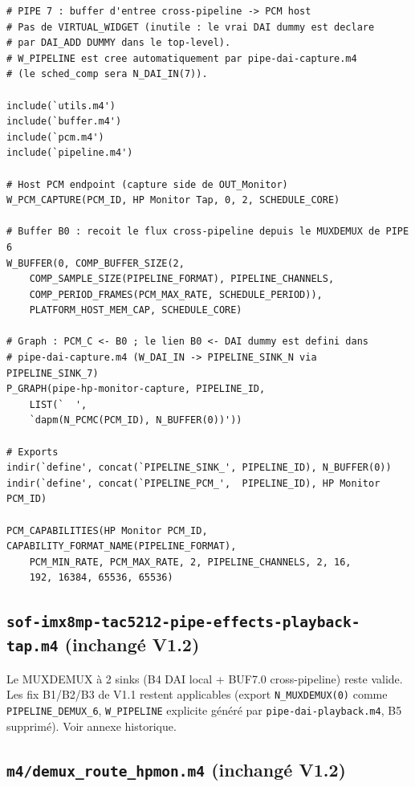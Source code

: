 \documentclass[11pt,a4paper]{article}
\begin{document}
\begin{lstlisting}[language={}, basicstyle=\ttfamily\scriptsize]
# PIPE 7 : buffer d'entree cross-pipeline -> PCM host
# Pas de VIRTUAL_WIDGET (inutile : le vrai DAI dummy est declare
# par DAI_ADD DUMMY dans le top-level).
# W_PIPELINE est cree automatiquement par pipe-dai-capture.m4
# (le sched_comp sera N_DAI_IN(7)).

include(`utils.m4')
include(`buffer.m4')
include(`pcm.m4')
include(`pipeline.m4')

# Host PCM endpoint (capture side de OUT_Monitor)
W_PCM_CAPTURE(PCM_ID, HP Monitor Tap, 0, 2, SCHEDULE_CORE)

# Buffer B0 : recoit le flux cross-pipeline depuis le MUXDEMUX de PIPE 6
W_BUFFER(0, COMP_BUFFER_SIZE(2,
    COMP_SAMPLE_SIZE(PIPELINE_FORMAT), PIPELINE_CHANNELS,
    COMP_PERIOD_FRAMES(PCM_MAX_RATE, SCHEDULE_PERIOD)),
    PLATFORM_HOST_MEM_CAP, SCHEDULE_CORE)

# Graph : PCM_C <- B0 ; le lien B0 <- DAI dummy est defini dans
# pipe-dai-capture.m4 (W_DAI_IN -> PIPELINE_SINK_N via PIPELINE_SINK_7)
P_GRAPH(pipe-hp-monitor-capture, PIPELINE_ID,
    LIST(`	',
    `dapm(N_PCMC(PCM_ID), N_BUFFER(0))'))

# Exports
indir(`define', concat(`PIPELINE_SINK_', PIPELINE_ID), N_BUFFER(0))
indir(`define', concat(`PIPELINE_PCM_',  PIPELINE_ID), HP Monitor PCM_ID)

PCM_CAPABILITIES(HP Monitor PCM_ID, CAPABILITY_FORMAT_NAME(PIPELINE_FORMAT),
    PCM_MIN_RATE, PCM_MAX_RATE, 2, PIPELINE_CHANNELS, 2, 16,
    192, 16384, 65536, 65536)
\end{lstlisting}

\subsection{\texttt{sof-imx8mp-tac5212-pipe-effects-playback-tap.m4} (inchangé V1.2)}

Le MUXDEMUX à 2 sinks (B4 DAI local + BUF7.0 cross-pipeline) reste valide. Les fix B1/B2/B3 de V1.1 restent applicables (export \texttt{N\_MUXDEMUX(0)} comme \texttt{PIPELINE\_DEMUX\_6}, \texttt{W\_PIPELINE} explicite généré par \texttt{pipe-dai-playback.m4}, B5 supprimé). Voir annexe historique.

\subsection{\texttt{m4/demux\_route\_hpmon.m4} (inchangé V1.2)}
\end{document}

